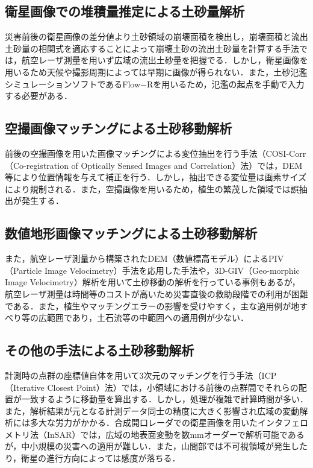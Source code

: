     \subsection{衛星画像での堆積量推定による土砂量解析}
      災害前後の衛星画像の差分値より土砂領域の崩壊面積を検出し，崩壊面積と流出土砂量の相関式を適応することによって崩壊土砂の流出土砂量を計算する手法\cite{土砂量解析5}では，航空レーザ測量を用いず広域の流出土砂量を把握でる．しかし，衛星画像を用いるため天候や撮影周期によっては早期に画像が得られない．また，土砂氾濫シミュレーションソフトであるFlow−R\cite{Flow-R}を用いるため，氾濫の起点を手動で入力する必要がある．

    \subsection{空撮画像マッチングによる土砂移動解析}
      前後の空撮画像を用いた画像マッチングによる変位抽出を行う手法（COSI-Corr（Co-registration of Optically Sensed Images and Correlation）法）\cite{土砂移動解析1}では，DEM等により位置情報を与えて補正を行う．しかし，抽出できる変位量は画素サイズにより規制される．また，空撮画像を用いるため，植生の繁茂した領域では誤抽出が発生する．

    \subsection{数値地形画像マッチングによる土砂移動解析}
      また，航空レーザ測量から構築されたDEM（数値標高モデル）によるPIV（Particle Image Velocimetry）手法\cite{土砂移動解析2}を応用した手法や，3D-GIV（Geo-morphic Image Velocimetry）解析\cite{土砂移動解析3, 土砂移動解析4, 土砂移動解析5}を用いて土砂移動の解析を行っている事例もあるが，航空レーザ測量は時間等のコストが高いため災害直後の救助段階での利用が困難である．また，植生やマッチングエラーの影響を受けやすく，主な適用例が地すべり等の広範囲であり，土石流等の中範囲への適用例が少ない．

    \subsection{その他の手法による土砂移動解析}
      計測時の点群の座標値自体を用いて3次元のマッチングを行う手法（ICP（Iterative Closest Point）法）\cite{土砂移動解析6}では，小領域における前後の点群間でそれらの配置が一致するように移動量を算出する．しかし，処理が複雑で計算時間が多い．また，解析結果が元となる計測データ同士の精度に大きく影響され広域の変動解析には多大な労力がかかる．合成開口レーダでの衛星画像を用いたインタフェロメトリ法（InSAR）\cite{土砂移動解析7}では，広域の地表面変動を数mmオーダーで解析可能であるが，中小規模の災害への適用が難しい．また，山間部では不可視領域が発生したり，衛星の進行方向によっては感度が落ちる．



